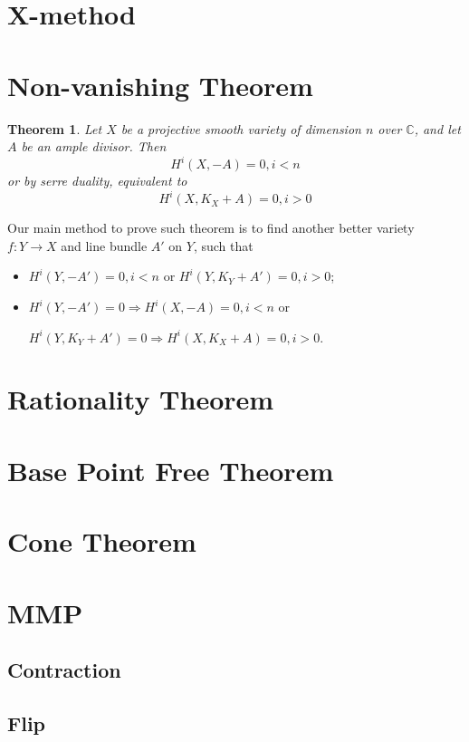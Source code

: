 \documentclass{article}
\newtheorem{thm}[defn]{Theorem}
\begin{document}
\section{X-method}

\section{Non-vanishing Theorem}

\begin{thm}
  Let $ X $ be a projective smooth variety of dimension $ n $ over $ \mathbb{C} $, and let  $ A $ be an ample divisor. Then
  \[ H^i(X,-A)=0,i<n \]
  or by serre duality, equivalent to
  \[ H^i(X,K_X+A)=0,i>0  \]
\end{thm}

Our main method to prove such theorem is to find another better variety $ f:Y\to X $ and line bundle $ A' $ on $ Y $, such that
\begin{itemize}
  \item $ H^i(Y,-A')=0,i<n  $ or $ H^i(Y,K_Y+A')=0,i>0  $;
  \item $ H^i(Y,-A')=0 \Rightarrow H^i(X,-A)=0,i<n  $  or
  
  $ H^i(Y,K_Y+A')=0 \Rightarrow  H^i(X,K_X+A)=0,i>0 $.
\end{itemize}

\section{Rationality Theorem}

\section{Base Point Free Theorem}

\section{Cone Theorem}

\section{MMP}

\subsection{Contraction}

\subsection{Flip}
\end{document}
